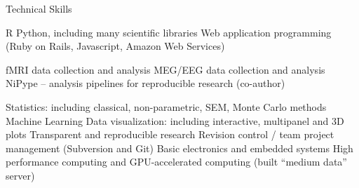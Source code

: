 \begin{rubric}{Technical Skills}

\entry* R
\entry* Python, including many scientific libraries
\entry* Web application programming (Ruby on Rails, Javascript, Amazon Web
Services)

\entry* fMRI data collection and analysis
\entry* MEG/EEG data collection and analysis
\entry* NiPype -- analysis pipelines for reproducible research (co-author)

\entry* Statistics: including classical, non-parametric, SEM, Monte Carlo methods
\entry* Machine Learning
\entry* Data visualization: including interactive, multipanel and 3D plots
\entry* Transparent and reproducible research
\entry* Revision control / team project management (Subversion and Git)
\entry* Basic electronics and embedded systems
\entry* High performance computing and GPU-accelerated computing
(built “medium data” server)

\end{rubric}
